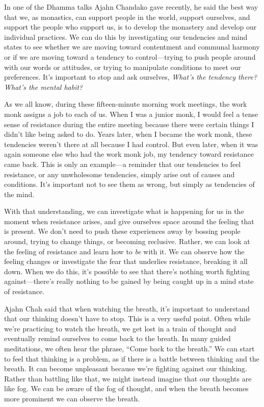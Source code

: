 
In one of the Dhamma talks Ajahn Chandako gave recently, he said the 
best way that we, as monastics, can support people in the world, 
support ourselves, and support the people who support us, is to develop 
the monastery and develop our individual practices. We can do this by 
investigating our tendencies and mind states to see whether we are 
moving toward contentment and communal harmony or if we are moving 
toward a tendency to control---trying to push people around with our 
words or attitudes, or trying to manipulate conditions to meet our 
preferences. It's important to stop and ask ourselves, \emph{What's the 
tendency there? What's the mental habit?}

As we all know, during these fifteen-minute morning work meetings, the 
work monk assigns a job to each of us. When I was a junior monk, I 
would feel a tense sense of resistance during the entire meeting 
because there were certain things I didn't like being asked to do. 
Years later, when I became the work monk, these tendencies weren't 
there at all because I had control. But even later, when it was again 
someone else who had the work monk job, my tendency toward resistance 
came back. This is only an example---a reminder that our tendencies to 
feel resistance, or any unwholesome tendencies, simply arise out of 
causes and conditions. It's important not to see them as wrong, but 
simply as tendencies of the mind.

With that understanding, we can investigate what is happening for us in 
the moment when resistance arises, and give ourselves space around the 
feeling that is present. We don't need to push these experiences away 
by bossing people around, trying to change things, or becoming 
reclusive. Rather, we can look at the feeling of resistance and learn 
how to \emph{be} with it. We can observe how the feeling changes or 
investigate the fear that underlies resistance, breaking it all down. 
When we do this, it's possible to see that there's nothing worth 
fighting against---there's really nothing to be gained by being caught 
up in a mind state of resistance.


Ajahn Chah said that when watching the breath, it's important to 
understand that our thinking doesn't have to stop. This is a very 
useful point. Often while we're practicing to watch the breath, we get 
lost in a train of thought and eventually remind ourselves to come back 
to the breath. In many guided meditations, we often hear the phrase, 
``Come back to the breath.'' We can start to feel that thinking is a 
problem, as if there is a battle between thinking and the breath. It 
can become unpleasant because we're fighting against our thinking. 
Rather than battling like that, we might instead imagine that our 
thoughts are like fog. We can be aware of the fog of thought, and when 
the breath becomes more prominent we can observe the breath.

